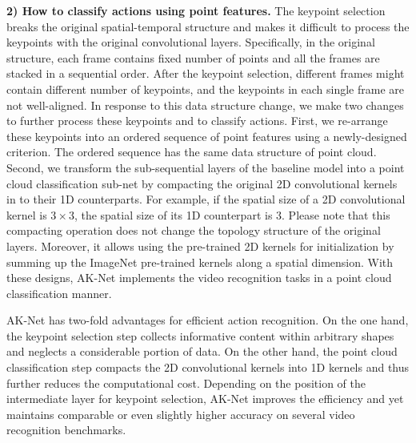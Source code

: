 \documentclass[journal]{IEEEtran}
\begin{document}
\textbf{2) How to classify actions using point features.}
The keypoint selection breaks the original spatial-temporal structure and makes it difficult to process the keypoints with the original convolutional layers. Specifically, in the original structure, each frame contains fixed number of points and all the frames are stacked in a sequential order. After the keypoint selection, different frames might contain different number of keypoints, and the keypoints in each single frame are not well-aligned. In response to this data structure change, we make two changes to further process these keypoints and to classify actions. First, we re-arrange these keypoints into an ordered sequence of point features using a newly-designed criterion. The ordered sequence has the same data structure of point cloud. Second, we transform the sub-sequential layers of the baseline model into a point cloud classification sub-net by compacting the original 2D convolutional kernels in to their 1D counterparts.  
For example, if the spatial size of a 2D convolutional kernel is $3 \times 3$, the spatial size of its 1D counterpart is $3$. Please note that this compacting operation does not change the topology structure of the original layers. Moreover, it allows using the pre-trained 2D kernels for initialization by summing up the ImageNet \cite{deng2009imagenet} pre-trained kernels along a spatial dimension. 
With these designs, AK-Net implements the video recognition tasks in a point cloud classification manner.

AK-Net has two-fold advantages for efficient action recognition. On the one hand, the keypoint selection step collects informative content within arbitrary shapes and neglects a considerable portion of data. On the other hand, the point cloud classification step compacts the 2D convolutional kernels into 1D kernels and thus further reduces the computational cost. Depending on the position of the intermediate layer for keypoint selection, AK-Net improves the efficiency and yet maintains comparable or even slightly higher accuracy on several video recognition benchmarks. 
\end{document}
